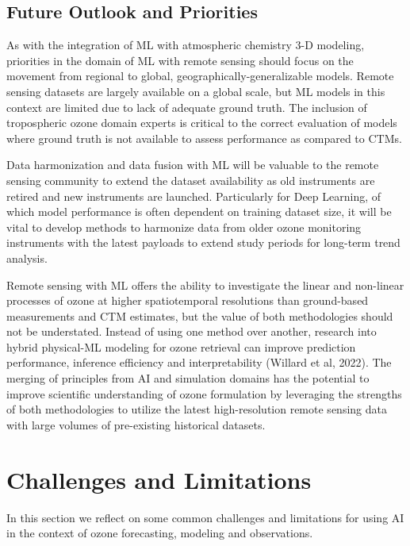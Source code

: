 \documentclass[gmd, manuscript]{copernicus}
\begin{document}
\subsection{Future Outlook and Priorities}
As with the integration of ML with atmospheric chemistry 3-D modeling, priorities in the domain of ML with remote sensing should focus on the movement from regional to global, geographically-generalizable models. Remote sensing datasets are largely available on a global scale, but ML models in this context are limited due to lack of adequate ground truth. The inclusion of tropospheric ozone domain experts is critical to the correct evaluation of models where ground truth is not available to assess performance as compared to CTMs. 

Data harmonization and data fusion with ML will be valuable to the remote sensing community to extend the dataset availability as old instruments are retired and new instruments are launched. Particularly for Deep Learning, of which model performance is often dependent on training dataset size, it will be vital to develop methods to harmonize data from older ozone monitoring instruments with the latest payloads to extend study periods for long-term trend analysis. 

Remote sensing with ML offers the ability to investigate the linear and non-linear processes of ozone at higher spatiotemporal resolutions than ground-based measurements and CTM estimates, but the value of both methodologies should not be understated. Instead of using one method over another, research into hybrid physical-ML modeling for ozone retrieval can improve prediction performance, inference efficiency and interpretability (Willard et al, 2022). The merging of principles from AI and simulation domains has the potential to improve scientific understanding of ozone formulation by leveraging the strengths of both methodologies to utilize the latest high-resolution remote sensing data with large volumes of pre-existing historical datasets.


\section{Challenges and Limitations}
In this section we reflect on some common challenges and limitations for using AI in the context of ozone forecasting, modeling and observations. 
\end{document}

